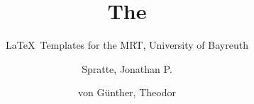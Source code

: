\documentclass[oneside,UKenglish]{MRTthesis}
\title{The \cls{MRTbundle}}
\subtitle{\LaTeX\ Templates for the MRT, University of Bayreuth}
\author[J. P. Spratte, T. von Günther]{Spratte, Jonathan P. \and von Günther, Theodor}
\begin{document}
\maketitle
\tableofcontents
\mainpart







\end{document}
